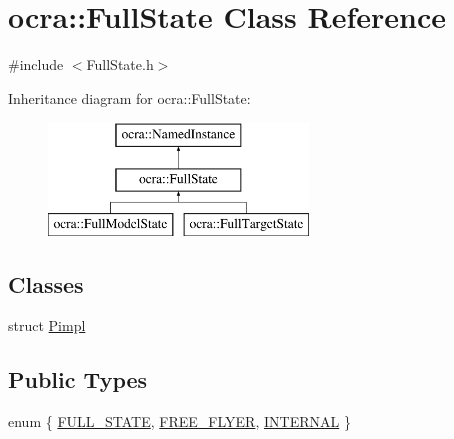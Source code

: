 \hypertarget{classocra_1_1FullState}{}\section{ocra\+:\+:Full\+State Class Reference}
\label{classocra_1_1FullState}


{\ttfamily \#include $<$Full\+State.\+h$>$}

Inheritance diagram for ocra\+:\+:Full\+State\+:\begin{figure}[H]
\begin{center}
\leavevmode
\includegraphics[height=3.000000cm]{d2/d99/classocra_1_1FullState}
\end{center}
\end{figure}
\subsection*{Classes}
\begin{DoxyCompactItemize}
\item 
struct \hyperlink{structocra_1_1FullState_1_1Pimpl}{Pimpl}
\end{DoxyCompactItemize}
\subsection*{Public Types}
\begin{DoxyCompactItemize}
\item 
enum \{ \hyperlink{classocra_1_1FullState_a8623fb06b8930505d950f7651e75b519af5d38d391c1a3c23006d51e6db4adea8}{F\+U\+L\+L\+\_\+\+S\+T\+A\+TE}, 
\hyperlink{classocra_1_1FullState_a8623fb06b8930505d950f7651e75b519a2b23349d3727ddf8b0d10a6c06dfcc31}{F\+R\+E\+E\+\_\+\+F\+L\+Y\+ER}, 
\hyperlink{classocra_1_1FullState_a8623fb06b8930505d950f7651e75b519a6c76abe0ec381b256a1e2429308126a5}{I\+N\+T\+E\+R\+N\+AL}
 \}
\end{DoxyCompactItemize}
